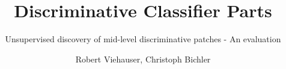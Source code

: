 



\title{Discriminative Classifier Parts} %

\subtitle{Unsupervised discovery of mid-level discriminative patches - An evaluation} %


\repdate{\today}          %






%






%

\author[ICG]{Robert Viehauser, Christoph Bichler}



%





\newcommand{\TUGn}{Graz University of Technology}

\address[ICG]{Inst. for Computer Graphics and Vision \\ \TUGn, Austria}



